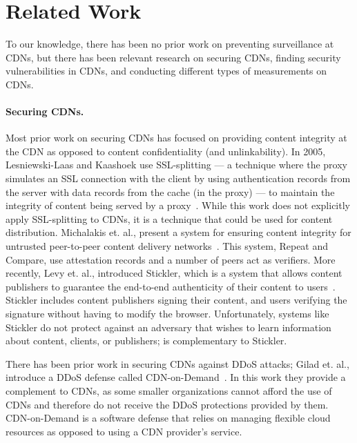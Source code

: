 \section{Related Work}
\label{sec:related}
To our knowledge, there has been no prior work on preventing surveillance at CDNs, but there 
has been relevant research on securing CDNs, finding security vulnerabilities in CDNs, and 
conducting different types of measurements on CDNs.

\paragraph{Securing CDNs.} Most prior work on securing CDNs has focused on providing content 
integrity at the CDN as opposed to content confidentiality (and unlinkability).  In 2005, 
Lesniewski-Laas and Kaashoek use SSL-splitting --- a technique 
where the proxy simulates an SSL connection with the client by using authentication records from 
the server with data records from the cache (in the proxy) --- to maintain the 
integrity of content being served by a proxy~\cite{lesniewski2005ssl}.  While this work does not 
explicitly apply SSL-splitting to CDNs, it is a technique that could be used for content 
distribution.  Michalakis et. al., present a system for ensuring content integrity for untrusted 
peer-to-peer content delivery networks~\cite{michalakis2007ensuring}.  This system, Repeat and 
Compare, use attestation records and a number of peers act as verifiers.  More recently, Levy et. al., 
introduced Stickler, which is a system that allows content publishers to guarantee the end-to-end 
authenticity of their content to users~\cite{levy2015stickler}.  Stickler includes content publishers 
signing their content, and users verifying the signature without having to modify the browser.  Unfortunately, 
systems like Stickler do not protect against an adversary that wishes to learn information about content, clients, 
or publishers; \system{} is complementary to Stickler.

There has been prior work in securing CDNs against DDoS attacks; Gilad 
et. al., introduce a DDoS defense called CDN-on-Demand~\cite{gilad2016cdn}.  In this work they 
provide a complement to CDNs, as some smaller organizations cannot afford the use of CDNs and 
therefore do not receive the DDoS protections provided by them.  CDN-on-Demand is a software 
defense that relies on managing flexible cloud resources as opposed to using a CDN provider's 
service.\\

